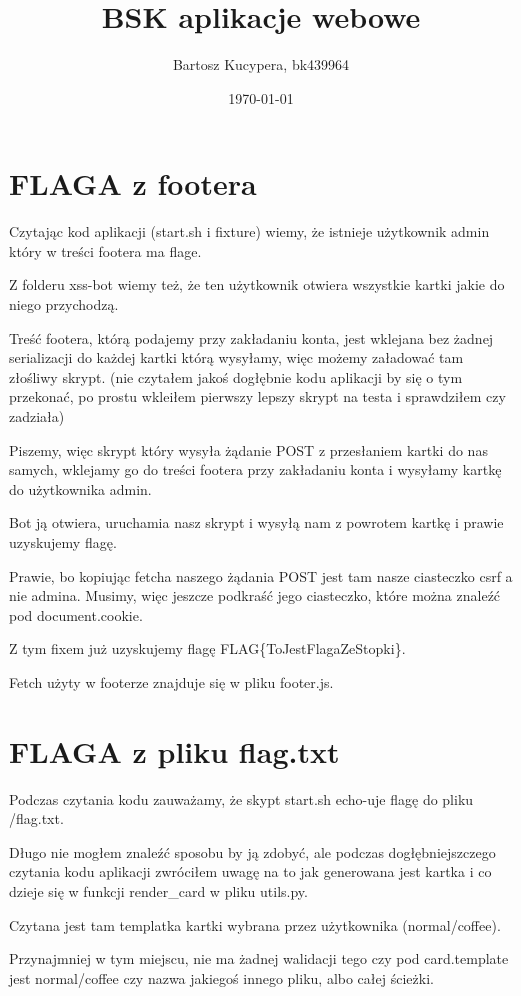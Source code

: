 \documentclass{article}
\title{BSK aplikacje webowe}
\author{Bartosz Kucypera, bk439964}
\date{\today}
\begin{document}
\maketitle

\section*{FLAGA z footera}
Czytając kod aplikacji (start.sh i fixture) wiemy, że istnieje użytkownik admin który w treści footera ma flage. 

Z folderu xss-bot wiemy też, że ten użytkownik otwiera wszystkie kartki jakie do niego przychodzą. 

Treść footera, którą podajemy przy zakładaniu konta, jest wklejana bez żadnej serializacji do każdej kartki którą wysyłamy, więc możemy załadować tam złośliwy skrypt. (nie czytałem jakoś dogłębnie kodu aplikacji by się o tym przekonać, po prostu wkleiłem pierwszy lepszy skrypt na testa i sprawdziłem czy zadziała)

Piszemy, więc skrypt który wysyła żądanie POST z przesłaniem kartki do nas samych, wklejamy go do treści footera przy zakładaniu konta i wysyłamy kartkę do użytkownika admin. 

Bot ją otwiera, uruchamia nasz skrypt i wysyłą nam z powrotem kartkę i prawie uzyskujemy flagę. 

Prawie, bo kopiując fetcha naszego żądania POST jest tam nasze ciasteczko csrf a nie admina. Musimy, więc jeszcze podkraść jego ciasteczko, które można znaleźć pod document.cookie.

Z tym fixem już uzyskujemy flagę FLAG\{ToJestFlagaZeStopki\}.

Fetch użyty w footerze znajduje się w pliku footer.js.

\section*{FLAGA z pliku flag.txt}
Podczas czytania kodu zauważamy, że skypt start.sh echo-uje flagę do pliku /flag.txt.

Długo nie mogłem znaleźć sposobu by ją zdobyć, ale podczas dogłębniejszczego czytania kodu aplikacji zwróciłem uwagę na to jak generowana jest kartka i co dzieje się w funkcji render\_card w pliku utils.py. 

Czytana jest tam templatka kartki wybrana przez użytkownika (normal/coffee).

Przynajmniej w tym miejscu, nie ma żadnej walidacji tego czy pod card.template jest normal/coffee czy nazwa jakiegoś innego pliku, albo całej ścieżki.
\end{document}
